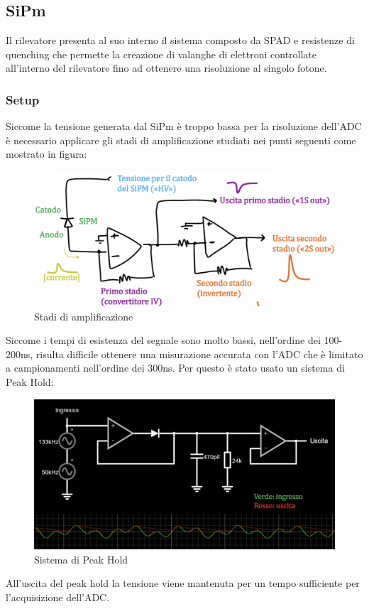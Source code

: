 
\subsection{SiPm}
Il rilevatore presenta al suo interno il sistema composto da SPAD e resistenze di quenching che permette la creazione di valanghe di elettroni controllate all'interno del rilevatore fino ad ottenere una risoluzione al singolo fotone.

\subsubsection{Setup}

Siccome la tensione generata dal SiPm è troppo bassa per la risoluzione dell'ADC è necessario applicare gli stadi di amplificazione studiati nei punti seguenti come mostrato in figura:

\begin{figure}[!h]
    \centering
    \includegraphics[width=0.5\linewidth]{Photomultiplier/assets/SiPm/SiPm_Stadi_Amp.png}
    \caption{Stadi di amplificazione}
    \label{fig:SiPm stadi di amp}
\end{figure}

Siccome i tempi di esistenza del segnale sono molto bassi, nell'ordine dei 100-200ns, risulta difficile ottenere una misurazione accurata con l'ADC che è limitato a campionamenti nell'ordine dei 300ns. Per questo è stato usato un sistema di Peak Hold:

\begin{figure}[!h]
    \centering
    \includegraphics[width=0.5\linewidth]{Photomultiplier/assets/SiPm/SiPm_Peak_hold.png}
    \caption{Sistema di Peak Hold}
\end{figure}

All'uscita del peak hold la tensione viene mantenuta per un tempo sufficiente per l'acquisizione dell'ADC.

